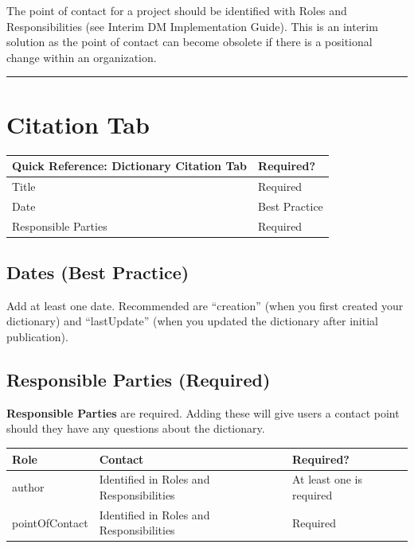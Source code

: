 \documentclass[
]{book}
\begin{document}
The point of contact for a project should be identified with Roles and Responsibilities (see Interim DM Implementation Guide). This is an interim solution as the point of contact can become obsolete if there is a positional change within an organization.

\begin{center}\rule{0.5\linewidth}{\linethickness}\end{center}

\hypertarget{citation-tab}{%
\section*{Citation Tab}\label{citation-tab}}

\begin{longtable}[]{@{}ll@{}}
\toprule
Quick Reference: Dictionary Citation Tab & Required?\tabularnewline
\midrule
\endhead
Title & Required\tabularnewline
Date & Best Practice\tabularnewline
Responsible Parties & Required\tabularnewline
\bottomrule
\end{longtable}

\hypertarget{dates-best-practice}{%
\subsection*{Dates (Best Practice)}\label{dates-best-practice}}

Add at least one date. Recommended are ``creation'' (when you first created your dictionary) and ``lastUpdate'' (when you updated the dictionary after initial publication).

\hypertarget{responsible-parties-required}{%
\subsection*{Responsible Parties (Required)}\label{responsible-parties-required}}

\textbf{Responsible Parties} are required. Adding these will give users a contact point should they have any questions about the dictionary.

\begin{longtable}[]{@{}lll@{}}
\toprule
Role & Contact & Required?\tabularnewline
\midrule
\endhead
author & Identified in Roles and Responsibilities & At least one is required\tabularnewline
pointOfContact & Identified in Roles and Responsibilities & Required\tabularnewline
\bottomrule
\end{longtable}
\end{document}

